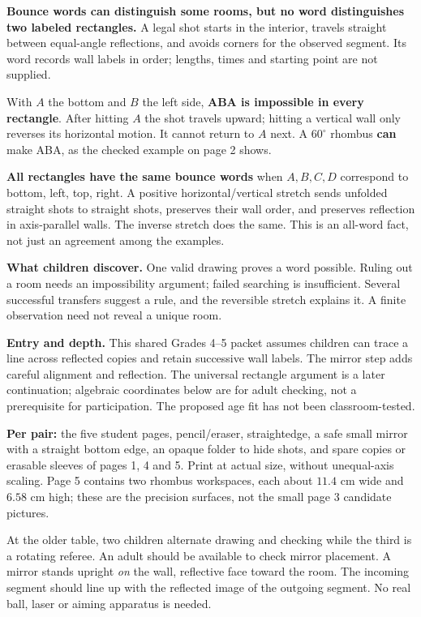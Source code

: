\documentclass[11pt,letterpaper]{article}
\newcommand{\sectiontitle}[1]{\par\vspace{4pt}{\large\bfseries #1}\par}
\begin{document}
\sectiontitle{The mathematics first}
\textbf{Bounce words can distinguish some rooms, but no word distinguishes two labeled rectangles.} A legal shot starts in the interior, travels straight between equal-angle reflections, and avoids corners for the observed segment. Its word records wall labels in order; lengths, times and starting point are not supplied.

With $A$ the bottom and $B$ the left side, \textbf{ABA is impossible in every rectangle}. After hitting $A$ the shot travels upward; hitting a vertical wall only reverses its horizontal motion. It cannot return to $A$ next. A $60^\circ$ rhombus \textbf{can} make ABA, as the checked example on page 2 shows.

\textbf{All rectangles have the same bounce words} when $A,B,C,D$ correspond to bottom, left, top, right. A positive horizontal/vertical stretch sends unfolded straight shots to straight shots, preserves their wall order, and preserves reflection in axis-parallel walls. The inverse stretch does the same. This is an all-word fact, not just an agreement among the examples.

\textbf{What children discover.} One valid drawing proves a word possible. Ruling out a room needs an impossibility argument; failed searching is insufficient. Several successful transfers suggest a rule, and the reversible stretch explains it. A finite observation need not reveal a unique room.

\textbf{Entry and depth.} This shared Grades 4--5 packet assumes children can trace a line across reflected copies and retain successive wall labels. The mirror step adds careful alignment and reflection. The universal rectangle argument is a later continuation; algebraic coordinates below are for adult checking, not a prerequisite for participation. The proposed age fit has not been classroom-tested.

\sectiontitle{Materials and the first visit}
\textbf{Per pair:} the five student pages, pencil/eraser, straightedge, a safe small mirror with a straight bottom edge, an opaque folder to hide shots, and spare copies or erasable sleeves of pages 1, 4 and 5. Print at actual size, without unequal-axis scaling. Page 5 contains two rhombus workspaces, each about $11.4$ cm wide and $6.58$ cm high; these are the precision surfaces, not the small page 3 candidate pictures.

At the older table, two children alternate drawing and checking while the third is a rotating referee. An adult should be available to check mirror placement. A mirror stands upright \emph{on} the wall, reflective face toward the room. The incoming segment should line up with the reflected image of the outgoing segment. No real ball, laser or aiming apparatus is needed.
\end{document}
